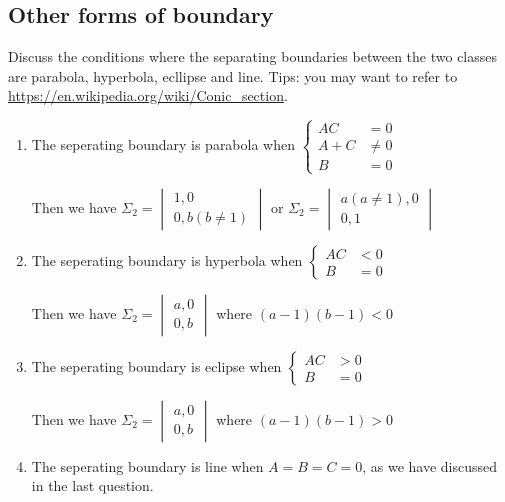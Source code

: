 \documentclass{article}
\newenvironment{answer}{\par\color{ForestGreen}}{\par}
\begin{document}
\subsection{Other forms of boundary}
Discuss the conditions where the separating boundaries between the two classes are parabola,
hyperbola, ecllipse and line. Tips: you may want to refer to \url{ https://en.wikipedia.org/wiki/Conic_section}.
\begin{answer}

\begin{enumerate}
    \item The seperating boundary is parabola when $\begin{cases} AC & = 0  \\
                                                     A + C & \neq 0  \\
                                                         B & = 0
                                          \end{cases}$

   Then we have $\Sigma_2 = \begin{vmatrix} 1, 0 \\ 0, b(b\neq1)\end{vmatrix} $
   or $\Sigma_2 = \begin{vmatrix} a(a\neq1), 0 \\ 0, 1\end{vmatrix} $

   \item The seperating boundary is hyperbola when $\begin{cases} AC & < 0  \\
                                                         B & = 0
                                          \end{cases}$

   Then we have $\Sigma_2 = \begin{vmatrix} a, 0 \\ 0, b\end{vmatrix} $ where $(a-1)(b-1) < 0$

  \item The seperating boundary is eclipse when $\begin{cases} AC & > 0  \\
                                                         B & = 0
                                          \end{cases}$

   Then we have $\Sigma_2 = \begin{vmatrix} a, 0 \\ 0, b\end{vmatrix} $ where $(a-1)(b-1) > 0$

   \item The seperating boundary is line when $A = B = C = 0$, as we have discussed in the last question.
\end{enumerate}
\end{answer}
\end{document}
